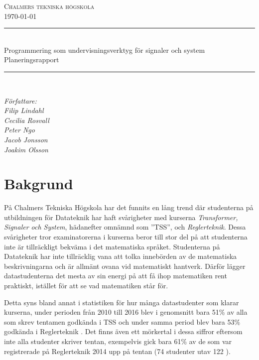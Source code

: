 \documentclass{article}
\begin{document}
\begin{titlepage} \newcommand{\HRule}{\rule{\linewidth}{0.3mm}}
\center
\textsc{\Large Chalmers tekniska högskola}\\[0.05cm]
\normalsize \today

\HRule \\[0.08cm]
{ \large  Programmering som undervisningsverktyg för signaler och system \\ \normalsize{Planeringsrapport}}\\[0.08cm] %
\HRule \\[0.3cm]

\vfill

\begin{flushleft} \small
    \emph{Författare: \\
    \quad Filip Lindahl\\
    \quad Cecilia Rosvall\\
    \quad Peter Ngo\\
    \quad Jacob Jonsson\\
    \quad Joakim Olsson\\}
\end{flushleft}
\end{titlepage}
\newpage
\tableofcontents
\newpage

\section{Bakgrund}
På Chalmers Tekniska Högskola har det funnits en lång trend
där studenterna på utbildningen för Datateknik har haft
svårigheter med kurserna \textit{Transformer, Signaler och System},
hädanefter omnämnd som ''TSS'', och \textit{Reglerteknik}.
Dessa svårigheter tror examinatorerna i kurserna beror till
stor del på att studenterna inte är tillräckligt bekväma
i det matematiska språket.
Studenterna på Datateknik har inte tillräcklig vana att
tolka innebörden av de matematiska beskrivningarna och är
allmänt ovana vid matematiskt hantverk.
Därför lägger datastudenterna det mesta av sin energi
på att få ihop matematiken rent praktiskt,
istället för att se vad matematiken står för.

Detta syns bland annat i statistiken för hur många
datastudenter som klarar kurserna, under perioden från
2010 till 2016 blev i genomsnitt bara 51\% av alla som skrev
tentamen godkända i TSS och under samma period blev
bara 53\% godkända i Reglerteknik \cite{tentastatistik}.
Det finns även ett mörkertal i dessa siffror eftersom inte alla
studenter skriver tentan, exempelvis gick bara 61\% av de som var
registrerade på Reglerteknik 2014 upp på tentan (74 studenter utav 122
\cite{kursinformation:ere102:14-15}).
\end{document}
